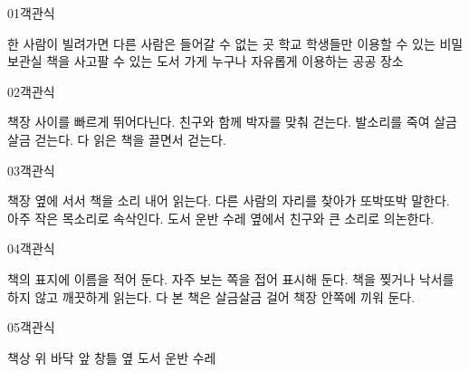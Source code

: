 \documentclass[fs13,seriesSau]{korfarm-base}
\begin{document}
\kfActivityBg \par{}\par\nopagebreak[4]\smallskip\nopagebreak[4]


\begin{kfQBlock}{01}{객관식}
\begin{kfChoices}
\kfChoice 한 사람이 빌려가면 다른 사람은 들어갈 수 없는 곳
\kfChoice 학교 학생들만 이용할 수 있는 비밀 보관실
\kfChoice 책을 사고팔 수 있는 도서 가게
\kfChoice 누구나 자유롭게 이용하는 공공 장소
\end{kfChoices}
\end{kfQBlock}
\begin{kfQBlock}{02}{객관식}
\begin{kfChoices}
\kfChoice 책장 사이를 빠르게 뛰어다닌다.
\kfChoice 친구와 함께 박자를 맞춰 걷는다.
\kfChoice 발소리를 죽여 살금살금 걷는다.
\kfChoice 다 읽은 책을 끌면서 걷는다.
\end{kfChoices}
\end{kfQBlock}
\begin{kfQBlock}{03}{객관식}
\begin{kfChoices}
\kfChoice 책장 옆에 서서 책을 소리 내어 읽는다.
\kfChoice 다른 사람의 자리를 찾아가 또박또박 말한다.
\kfChoice 아주 작은 목소리로 속삭인다.
\kfChoice 도서 운반 수레 옆에서 친구와 큰 소리로 의논한다.
\end{kfChoices}
\end{kfQBlock}
\begin{kfQBlock}{04}{객관식}
\begin{kfChoices}
\kfChoice 책의 표지에 이름을 적어 둔다.
\kfChoice 자주 보는 쪽을 접어 표시해 둔다.
\kfChoice 책을 찢거나 낙서를 하지 않고 깨끗하게 읽는다.
\kfChoice 다 본 책은 살금살금 걸어 책장 안쪽에 끼워 둔다.
\end{kfChoices}
\end{kfQBlock}
\begin{kfQBlock}{05}{객관식}
\begin{kfChoices}
\kfChoice 책상 위
\kfChoice 바닥 앞
\kfChoice 창틀 옆
\kfChoice 도서 운반 수레
\end{kfChoices}
\end{kfQBlock}
\end{document}
